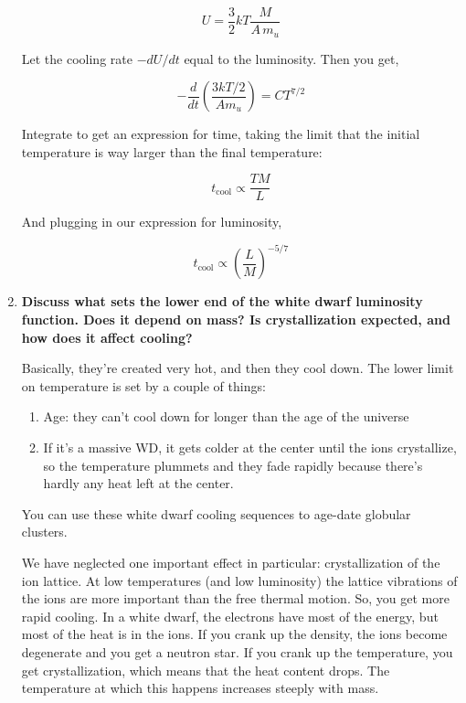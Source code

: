 \documentclass[a4paper]{article}
\begin{document}
\begin{enumerate}
\begin{equation}
U = \frac{3}{2} kT \frac{M}{A \, m_u}
\end{equation}

Let the cooling rate $-dU/dt$ equal to the luminosity. Then you get,

$$ -\frac{d}{dt} \left( \frac{3kT/2}{A m_u} \right) = CT^{7/2}$$

Integrate to get an expression for time, taking the limit that the initial temperature is way larger than the final temperature:

$$ t_{\mathrm{cool}} \propto \frac{TM}{L} $$

And plugging in our expression for luminosity,

$$ t_{\mathrm{cool}} \propto \left( \frac{L}{M} \right)^{-5/7}$$

\item \textbf{Discuss what sets the lower end of the white dwarf luminosity function. Does it depend on mass? Is crystallization expected, and how does it affect cooling?}

Basically, they're created very hot, and then they cool down. The lower limit on temperature is set by a couple of things:

\begin{enumerate}
\item Age: they can't cool down for longer than the age of the universe
\item If it's a massive WD, it gets colder at the center until the ions crystallize, so the temperature plummets and they fade rapidly because there's hardly any heat left at the center. 
\end{enumerate}

You can use these white dwarf cooling sequences to age-date globular clusters. 

We have neglected one important effect in particular: crystallization of the ion lattice. At low temperatures (and low luminosity) the lattice vibrations of the ions are more important than the free thermal motion. So, you get more rapid cooling. 
In a white dwarf, the electrons have most of the energy, but most of the heat is in the ions. 
If you crank up the density, the ions become degenerate and you get a neutron star. If you crank up the temperature, you get crystallization, which means that the heat content drops. The temperature at which this happens increases steeply with mass.


\end{enumerate}
\end{document}
